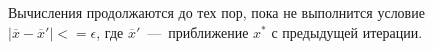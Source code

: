 Вычисления продолжаются до тех пор, пока не выполнится условие $|\overline{x} - \overline{x}'| <= \epsilon$, где $\overline{x}'$~---~приближение $x^{*}$ с предыдущей итерации.


